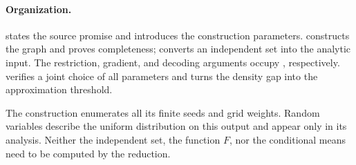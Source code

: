 \paragraph{Organization.}
 states the source promise and introduces the
construction parameters.
 constructs the graph and proves completeness;
 converts an independent set into the analytic
input. The restriction, gradient, and decoding arguments occupy
, respectively.
 verifies a joint choice of all parameters and
turns the density gap into the approximation threshold.

The construction enumerates all its finite seeds and grid weights.
Random variables describe the uniform distribution on this output
and appear only in its analysis. Neither the independent set, the
function \(F\), nor the conditional means need to be computed by
the reduction.
